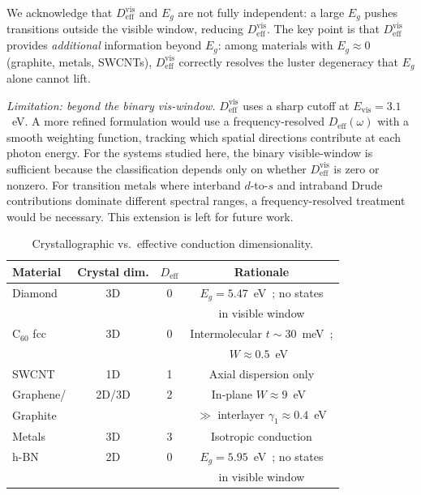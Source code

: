 \documentclass[twocolumn,showpacs,preprintnumbers,amsmath,amssymb,prb]{revtex4-2}
\begin{document}
We acknowledge that $D_\mathrm{eff}^\mathrm{vis}$ and $E_g$ are
not fully independent: a large $E_g$ pushes transitions outside
the visible window, reducing $D_\mathrm{eff}^\mathrm{vis}$.
The key point is that $D_\mathrm{eff}^\mathrm{vis}$ provides
\emph{additional} information beyond $E_g$: among materials with
$E_g \approx 0$ (graphite, metals, SWCNTs),
$D_\mathrm{eff}^\mathrm{vis}$ correctly resolves the luster
degeneracy that $E_g$ alone cannot lift.

\emph{Limitation: beyond the binary vis-window.}
$D_\mathrm{eff}^\mathrm{vis}$ uses a sharp cutoff at
$E_\mathrm{vis} = 3.1$~eV. A more refined formulation would use
a frequency-resolved $D_\mathrm{eff}(\omega)$ with a smooth
weighting function, tracking which spatial directions contribute
at each photon energy. For the systems studied here, the binary
visible-window is sufficient because the classification depends
only on whether $D_\mathrm{eff}^\mathrm{vis}$ is zero or nonzero.
For transition metals where interband $d$-to-$s$ and intraband
Drude contributions dominate different spectral ranges, a
frequency-resolved treatment would be necessary.
This extension is left for future work.

\begin{table}[h]
\caption{Crystallographic vs.\ effective conduction dimensionality.}
\label{tab:Deff}
\begin{ruledtabular}
\begin{tabular}{lccc}
  Material & Crystal dim. & $D_\mathrm{eff}$ & Rationale \\
  \hline
  Diamond      & 3D     & 0 & $E_g = 5.47$~eV~\cite{Clark1964}; no states \\
               &        &   & in visible window \\
  C$_{60}$ fcc & 3D     & 0 & Intermolecular $t \sim 30$~meV~\cite{Hebard1991}; \\
               &        &   & $W \approx 0.5$~eV~\cite{Gunnarsson1997} \\
  SWCNT        & 1D     & 1 & Axial dispersion only \\
  Graphene/    & 2D/3D  & 2 & In-plane $W \approx 9$~eV~\cite{Reich2002} \\
  \quad Graphite &      &   & $\gg$ interlayer $\gamma_1 \approx 0.4$~eV \\
  Metals       & 3D     & 3 & Isotropic conduction \\
  h-BN         & 2D     & 0 & $E_g = 5.95$~eV~\cite{Cassabois2016}; no states \\
               &        &   & in visible window \\
\end{tabular}
\end{ruledtabular}
\end{table}
\end{document}
